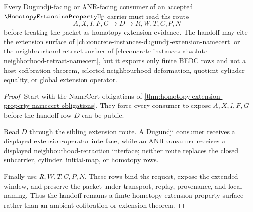 \begin{theorem}
\label{thm:homotopy-extension-property-dugundji-handoff}
Every Dugundji-facing or ANR-facing consumer of an accepted $\HomotopyExtensionPropertyUp$ carrier must read the route
$$
A,X,I,F,G \longmapsto D \longmapsto R,W,T,C,P,N
$$
before treating the packet as homotopy-extension evidence. The handoff may cite the extension surface of \autoref{ch:concrete-instances-dugundji-extension-namecert} or the neighbourhood-retract surface of \autoref{ch:concrete-instances-absolute-neighborhood-retract-namecert}, but it exports only finite BEDC rows and not a host cofibration theorem, selected neighbourhood deformation, quotient cylinder equality, or global extension operator.
\end{theorem}
\begin{proof}
Start with the NameCert obligations of \autoref{thm:homotopy-extension-property-namecert-obligations}. They force every consumer to expose $A,X,I,F,G$ before the handoff row $D$ can be public.

Read $D$ through the sibling extension route. A Dugundji consumer receives a displayed extension-operator interface, while an ANR consumer receives a displayed neighbourhood-retraction interface; neither route replaces the closed subcarrier, cylinder, initial-map, or homotopy rows.

Finally use $R,W,T,C,P,N$. These rows bind the request, expose the extended window, and preserve the packet under transport, replay, provenance, and local naming. Thus the handoff remains a finite homotopy-extension property surface rather than an ambient cofibration or extension theorem.
\end{proof}


\begin{closurestatus}{\HomotopyExtensionPropertyUp}
  \theoryclosure{\seedClosure}
  \formalstatus{\unformalizedV}
\end{closurestatus}
